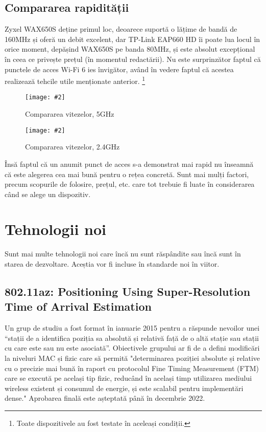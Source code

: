 \documentclass[a4paper,12pt]{report}
\def\oldchapter{} \let\oldchapter=\chapter{}
\def\chapter{\stepcounter{num_chapters}\oldchapter}
\newcommand{\centeredImageWithCaption}[2]{%
  \begin{figure}[H]
    \caption{#1}
    \texttt{[image: \#2]}
    \centering
  \end{figure}}
\begin{document}
\section{Compararea rapidității}

\cite{standards_ieee802_11_timeline}

Zyxel WAX650S deține primul loc, deoarece suportă o lățime de bandă de 160MHz și oferă un debit excelent, dar TP-Link EAP660 HD îi poate lua locul în orice moment, depășind WAX650S pe banda 80MHz, și este absolut excepțional în ceea ce privește prețul (în momentul redactării).
Nu este surprinzător faptul că punctele de acces Wi-Fi 6 ies învigător, având în vedere faptul că acestea realizează tehcile utile menționate anterior. \footnote{Toate dispozitivele au fost testate în aceleași condiții.}

\centeredImageWithCaption{Compararea vitezelor, 5GHz}{https://www.mbreviews.com/wp-content/uploads/2022/01/best-wireless-access-points-1-re-new.jpg}

\centeredImageWithCaption{Compararea vitezelor, 2.4GHz}{https://www.mbreviews.com/wp-content/uploads/2022/01/best-wireless-access-points-2-re-new.jpg}


Însă faptul că un anumit punct de acces s-a demonstrat mai rapid nu înseamnă că este alegerea cea mai bună pentru o rețea concretă. Sunt mai mulți factori, precum scopurile de folosire, prețul, etc. care tot trebuie fi luate în considerarea când se alege un dispozitiv.


\chapter{Tehnologii noi}

Sunt mai multe tehnologii noi care încă nu sunt răspândite sau încă sunt în starea de dezvoltare.
Aceștia vor fi incluse în standarde noi în viitor.

\section{802.11az: Positioning Using Super-Resolution Time of Arrival Estimation}

Un grup de studiu a fost format în ianuarie 2015 pentru a răspunde nevoilor unei ``stații de a identifica poziția sa absolută și relativă față de o altă stație sau stații cu care este sau nu este asociată''.
Obiectivele grupului ar fi de a defini modificări la niveluri MAC și fizic care să permită "determinarea poziției absolute și relative cu o precizie mai bună în raport cu protocolul Fine Timing Measurement (FTM) care se execută pe același tip fizic, reducând în același timp utilizarea mediului wireless existent și consumul de energie, și este scalabil pentru implementări dense."
Aprobarea finală este așteptată până în decembrie 2022.
\end{document}

